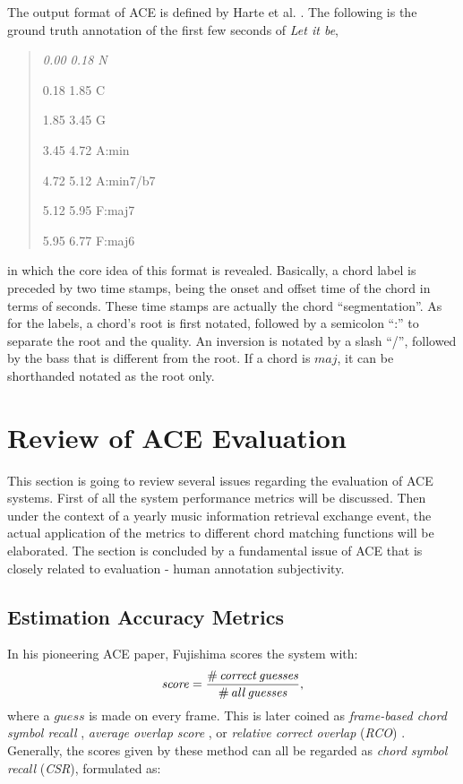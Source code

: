 The output format of ACE is defined by Harte et al. \cite{harte2005symbolic}. The following is the ground truth annotation of the first few seconds of {\it Let it be},
\begin{quote}\footnotesize \it
0.00 0.18 N

0.18 1.85 C

1.85 3.45 G

3.45 4.72 A:min

4.72 5.12 A:min7/b7

5.12 5.95 F:maj7

5.95 6.77 F:maj6
\end{quote}
in which the core idea of this format is revealed. Basically, a chord label is preceded by two time stamps, being the onset and offset time of the chord in terms of seconds. These time stamps are actually the chord ``segmentation''. As for the labels, a chord's root is first notated, followed by a semicolon ``:'' to separate the root and the quality. An inversion is notated by a slash ``/'', followed by the bass that is different from the root. If a chord is $maj$, it can be shorthanded notated as the root only.

\newpage
\section{Review of ACE Evaluation} \label{sec:2-eval}
This section is going to review several issues regarding the evaluation of ACE systems. First of all the system performance metrics will be discussed. Then under the context of a yearly music information retrieval exchange event, the actual application of the metrics to different chord matching functions will be elaborated. The section is concluded by a fundamental issue of ACE that is closely related to evaluation - human annotation subjectivity.

\subsection{Estimation Accuracy Metrics} \label{subsec:2-metrics}
In his pioneering ACE paper, Fujishima \cite{fujishima1999realtime} scores the system with:
\begin{equation}\label{eq:2-fujiscore}
\mathit{score = {\#\,correct\,guesses\over\#\,all\,guesses},}
\end{equation}
where a $guess$ is made on every frame. This is later coined as {\it frame-based chord symbol recall} \cite{harte2010towards}, {\it average overlap score} \cite{oudre2010template}, or {\it relative correct overlap} (\textit{RCO}) \cite{mauch2010automatic}. Generally, the scores given by these method can all be regarded as {\it chord symbol recall} (\textit{CSR}), formulated as:

